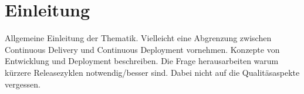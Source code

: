 \section{Einleitung}
\label{sec:einleitung}

\begin{wichtigbox}
Allgemeine Einleitung der Thematik. Vielleicht eine Abgrenzung zwischen
Continuous Delivery und Continuous Deployment vornehmen. Konzepte von
Entwicklung und Deployment beschreiben. Die Frage herausarbeiten warum kürzere
Releasezyklen notwendig/besser sind. Dabei nicht auf die Qualitäsaspekte
vergessen.
\end{wichtigbox}